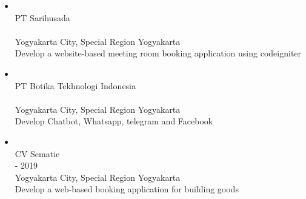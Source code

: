 \begin{itemize}
    \item {\color{LinkedInBlue} }\\
    {
        \mybullet PT Sarihusada \\
         \\
        \mybullet Yogyakarta City, Special Region Yogyakarta \\
        \mybullet Develop a website-based meeting room booking application using codeigniter \\
    }

    \item {\color{LinkedInBlue} }\\
    {
        \mybullet PT Botika Tekhnologi Indonesia \\
         \\
        \mybullet Yogyakarta City, Special Region Yogyakarta \\
        \mybullet Develop Chatbot, Whatsapp, telegram and Facebook \\
    }

    \item {\color{LinkedInBlue} }\\
    {
        \mybullet CV Sematic \\
         - 2019 \\
        \mybullet Yogyakarta City, Special Region Yogyakarta \\
        \mybullet Develop a web-based booking application for building goods \\
    }

\end{itemize}

